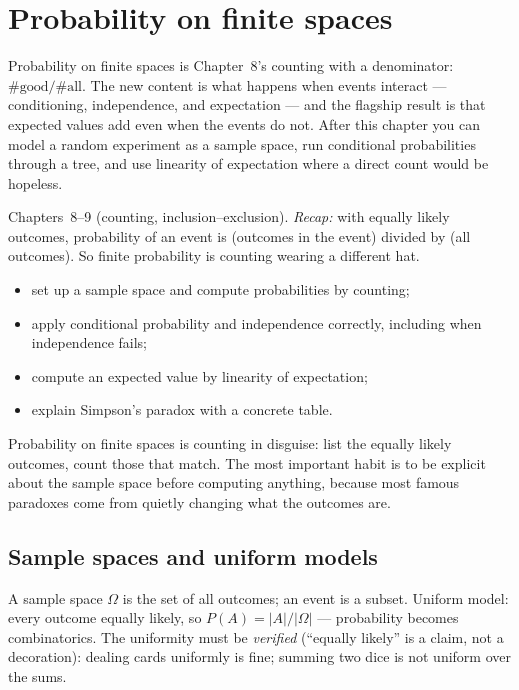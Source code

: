 \chapter{Probability on finite spaces}\label{ch:prob}

Probability on finite spaces is Chapter~8's counting with a
denominator: $\#\text{good} / \#\text{all}$. The new content is what
happens when events interact --- conditioning, independence, and
expectation --- and the flagship result is that expected values add
even when the events do not. After this chapter you can model a random
experiment as a sample space, run conditional probabilities through a
tree, and use linearity of expectation where a direct count would be
hopeless.

\begin{rulebox}
Chapters~8--9 (counting, inclusion--exclusion). \emph{Recap:} with equally likely outcomes, probability of an event is (outcomes in the event) divided by (all outcomes). So finite probability is counting wearing a different hat.
\end{rulebox}
\begin{wins}
\begin{itemize}
\item set up a sample space and compute probabilities by counting;
\item apply conditional probability and independence correctly, including when independence fails;
\item compute an expected value by linearity of expectation;
\item explain Simpson's paradox with a concrete table.
\end{itemize}
\end{wins}
\begin{principle}
Probability on finite spaces is counting in disguise: list the equally likely outcomes, count those that match. The most important habit is to be explicit about the sample space before computing anything, because most famous paradoxes come from quietly changing what the outcomes are.
\end{principle}

\section{Sample spaces and uniform models}\label{sec:sample}
A sample space $\Omega$ is the set of all outcomes; an event is a
subset. Uniform model: every outcome equally likely, so
$P(A) = |A|/|\Omega|$ --- probability becomes combinatorics. The
uniformity must be \emph{verified} (``equally likely'' is a claim, not a
decoration): dealing cards uniformly is fine; summing two dice is not
uniform over the sums.

